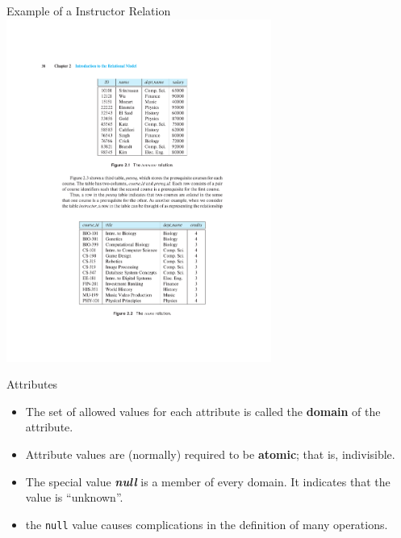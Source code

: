 \documentclass{beamer}
\begin{document}
\begin{frame}{Example of a Instructor Relation}
    \centering
    \vspace{5mm}
    \includegraphics[width=0.65\textwidth, trim={7.25cm 16.75cm 6.5cm 4.75cm}, clip]{figures/Instructor_relation}
\end{frame}

\begin{frame}{Attributes}
    \begin{itemize}
        \item The set of allowed values for each attribute is called the \textbf{domain} of the attribute.
        \item Attribute values are (normally) required to be \textbf{atomic}; that is, indivisible.
        \item The special value \textbf{\textit{null}} is a member of every domain.  It indicates that the value is ``unknown''.
        \item the \texttt{null} value causes complications in the definition of many operations.
    \end{itemize}
\end{frame}
\end{document}
